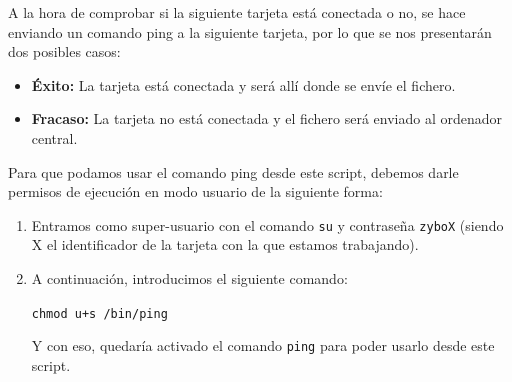 A la hora de comprobar si la siguiente tarjeta está conectada o no, se hace enviando un comando ping a la siguiente tarjeta, por lo que se nos presentarán dos posibles casos:
\begin{itemize}
	\item \textbf{Éxito:} La tarjeta está conectada y será allí donde se envíe el fichero.
	\item \textbf{Fracaso:} La tarjeta no está conectada y el fichero será enviado al ordenador central.
\end{itemize}

Para que podamos usar el comando ping desde este script, debemos darle permisos de ejecución en modo usuario de la siguiente forma:
\begin{enumerate}
	\item Entramos como super-usuario con el comando \texttt{su} y contraseña \texttt{zyboX} (siendo X el identificador de la tarjeta con la que estamos trabajando).
	\item A continuación, introducimos el siguiente comando:
	\begin{center}
		\texttt{chmod u+s /bin/ping}
	\end{center}
	Y con eso, quedaría activado el comando \texttt{ping} para poder usarlo desde este script.
\end{enumerate}

\newpage
